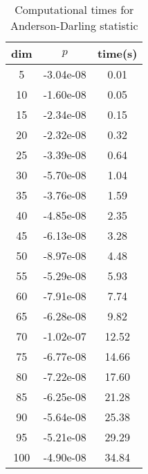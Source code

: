 \begin{table}[htbp]
\begin{center}
\begin{tabular}{ccc}
dim& $p$ & time(s)\\
\hline
5 & -3.04e-08 & 0.01 \\ 
10 & -1.60e-08 & 0.05 \\ 
15 & -2.34e-08 & 0.15 \\ 
20 & -2.32e-08 & 0.32 \\ 
25 & -3.39e-08 & 0.64 \\ 
30 & -5.70e-08 & 1.04 \\ 
35 & -3.76e-08 & 1.59 \\ 
40 & -4.85e-08 & 2.35 \\ 
45 & -6.13e-08 & 3.28 \\ 
50 & -8.97e-08 & 4.48 \\ 
55 & -5.29e-08 & 5.93 \\ 
60 & -7.91e-08 & 7.74 \\ 
65 & -6.28e-08 & 9.82 \\ 
70 & -1.02e-07 & 12.52 \\ 
75 & -6.77e-08 & 14.66 \\ 
80 & -7.22e-08 & 17.60 \\ 
85 & -6.25e-08 & 21.28 \\ 
90 & -5.64e-08 & 25.38 \\ 
95 & -5.21e-08 & 29.29 \\ 
100 & -4.90e-08 & 34.84 \\ 
\hline
\end{tabular}
\end{center}
\caption{Computational times for Anderson-Darling statistic}
\label{tab:AD}
\end{table}
